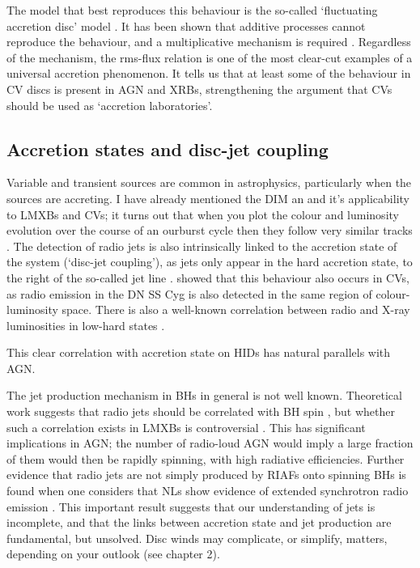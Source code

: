 The model that best reproduces this behaviour is the so-called
`fluctuating accretion disc' model \citep{lyubarskii1997,kotov2001,
arevalo2006,hogg2015}. It has been shown that 
additive processes cannot reproduce the behaviour, and a multiplicative
mechanism is required \citep{uttley2005}. 
Regardless of the mechanism, the rms-flux relation is one of the most
clear-cut examples of a universal accretion phenomenon. 
It tells us that at least some of the behaviour in CV discs
is present in AGN and XRBs, strengthening the argument that CVs
should be used as `accretion laboratories'. 


\subsection{Accretion states and disc-jet coupling}
\label{sec:disc-jet}

Variable and transient sources are common in astrophysics, particularly
when the sources are accreting. I have already mentioned the DIM an
and it's applicability to LMXBs and CVs; it turns out that when you plot
the colour and luminosity evolution over the course of an ourburst cycle 
then they follow very similar tracks \citep[see figure~\ref{fig:kording_hid}, ][]{kordingDNjet2008}.
The detection of radio jets is also intrinsically linked to the accretion state
of the system (`disc-jet coupling'), as jets only appear in the hard accretion 
state, to the right of the so-called jet line \citep{fender2001,fender2004}.
\cite{kordingDNjet2008} showed that this behaviour also occurs in CVs, 
as radio emission in the DN SS Cyg is also detected in the same region 
of colour-luminosity space. There is also a well-known correlation between 
radio and X-ray luminosities in low-hard states \citep{gallo2003}.

This clear correlation with accretion state on HIDs has natural parallels 
with AGN. 


The jet production mechanism in BHs in general is not well known. 
Theoretical work suggests that radio jets should be correlated with BH spin \cite{penrose1971,blandford1977}, 
but whether such a correlation exists in LMXBs is controversial \citep{fender2010,narayan2012}.
This has significant implications in AGN; the number of radio-loud AGN
would imply a large fraction of them would then be rapidly spinning, with
high radiative efficiencies. 
Further evidence that radio jets are not simply produced by RIAFs onto spinning
BHs is found when one considers that NLs show evidence of extended synchrotron
radio emission \citep{coppejans2015}. This important result suggests that our understanding
of jets is incomplete, and that the links between accretion state and 
jet production are fundamental, but unsolved. Disc winds may complicate, or simplify,
matters, depending on your outlook (see chapter 2).

